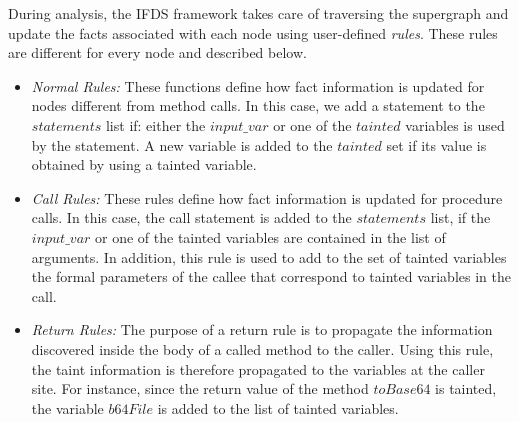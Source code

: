 During analysis, the IFDS framework takes care of traversing the supergraph and update the facts associated with each node using user-defined \emph{rules}. These rules are different for every node and described below.
\begin{itemize}
 \item \textit{Normal Rules:} These functions define how fact information is updated for nodes different from method calls. In this case, we add a statement to the $statements$ list if: either the $input\_var$ or one of the $tainted$ variables is used by the statement. A new variable is added to the $tainted$ set if its value is obtained by using a tainted variable.
 \item \textit{Call Rules:} These rules define how fact information is updated for procedure calls. In this case, the call statement is added to the $statements$ list, if the $input\_var$ or one of the tainted variables are contained in the list of arguments. In addition, this rule is used to add to the set of tainted variables the formal parameters of the callee that correspond to tainted variables in the call.
 \item \textit{Return Rules:} The purpose of a return rule is to propagate the information discovered inside the body of a called method to the caller. Using this rule, the taint information is therefore propagated to the variables at the caller site. For instance, since the return value of the method $toBase64$ is tainted, the variable $b64File$ is added to the list of tainted variables.
\end{itemize}



